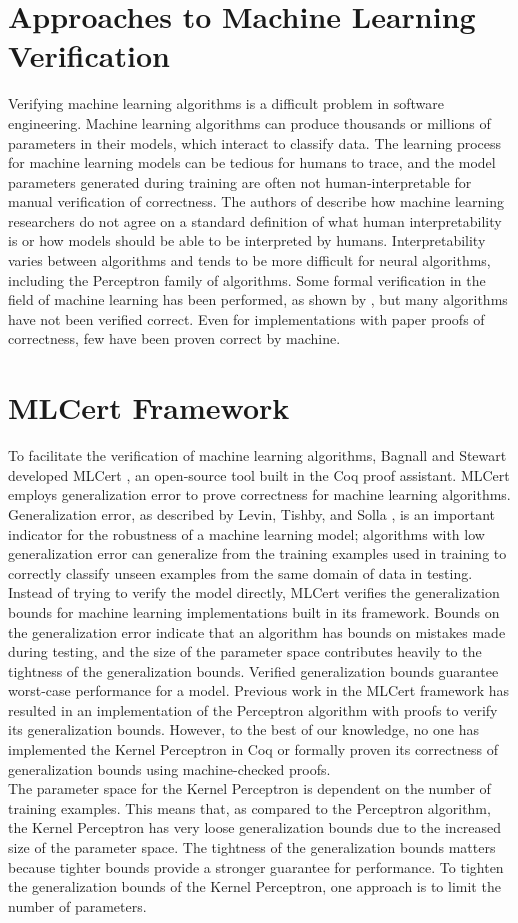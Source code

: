 \section{Approaches to Machine Learning Verification}\label{MLVerificationSection}
Verifying machine learning algorithms is a difficult problem in software engineering. Machine learning algorithms can produce thousands or millions of parameters in their models, which interact to classify data. The learning process for machine learning models can be tedious for humans to trace, and the model parameters generated during training are often not human-interpretable for manual verification of correctness. The authors of \cite{BF16} describe how machine learning researchers do not agree on a standard definition of what human interpretability is or how models should be able to be interpreted by humans. Interpretability varies between algorithms and tends to be more difficult for neural algorithms, including the Perceptron family of algorithms. Some formal verification in the field of machine learning has been performed, as shown by \cite{TD05}, but many algorithms have not been verified correct. Even for implementations with paper proofs of correctness, few have been proven correct by machine.
\section{MLCert Framework}\label{MLCertFrameworkSection}
To facilitate the verification of machine learning algorithms, Bagnall and Stewart developed MLCert \cite{BS19}, an open-source tool built in the Coq proof assistant. MLCert employs generalization error to prove correctness for machine learning algorithms. Generalization error, as described by Levin, Tishby, and Solla \cite{LTS90}, is an important indicator for the robustness of a machine learning model; algorithms with low generalization error can generalize from the training examples used in training to correctly classify unseen examples from the same domain of data in testing. Instead of trying to verify the model directly, MLCert verifies the generalization bounds for machine learning implementations built in its framework. Bounds on the generalization error indicate that an algorithm has bounds on mistakes made during testing, and the size of the parameter space contributes heavily to the tightness of the generalization bounds. Verified generalization bounds guarantee worst-case performance for a model. Previous work in the MLCert framework \cite{BS19} has resulted in an implementation of the Perceptron algorithm with proofs to verify its generalization bounds. However, to the best of our knowledge, no one has implemented the Kernel Perceptron in Coq or formally proven its correctness of generalization bounds using machine-checked proofs.
\\The parameter space for the Kernel Perceptron is dependent on the number of training examples. This means that, as compared to the Perceptron algorithm, the Kernel Perceptron has very loose generalization bounds due to the increased size of the parameter space. The tightness of the generalization bounds matters because tighter bounds provide a stronger guarantee for performance. To tighten the generalization bounds of the Kernel Perceptron, one approach is to limit the number of parameters.
